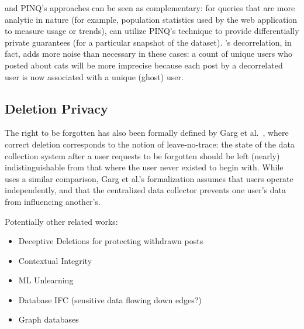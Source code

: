 \name and PINQ's approaches can be seen as complementary: for queries that are more analytic in nature (for example,
population statistics used by the web application to measure usage or trends), \name can utilize
PINQ's technique to provide differentially private guarantees (for a particular snapshot of the
dataset).  \name's decorrelation, in fact, adds more noise than necessary in these cases: a count
of unique users who posted about cats will be more imprecise because each post by a decorrelated
user is now associated with a unique (ghost) user.

\subsection{Deletion Privacy}
The right to be forgotten has also been formally defined by Garg et
al.~\cite{garg}, where correct deletion corresponds to the notion of
leave-no-trace: the state of the data collection system after a user requests to be forgotten should
be left (nearly) indistinguishable from that where the user never existed to begin with. While
\name uses a similar comparison, Garg et al.'s formalization assumes that users operate
independently, and that the centralized data collector prevents one user's data from influencing
another's.

Potentially other related works:
\begin{itemize}
    \item Deceptive Deletions for protecting withdrawn posts %
    \item Contextual Integrity
    \item ML Unlearning
    \item Database IFC (sensitive data flowing down edges?)
    \item Graph databases
\end{itemize}
\fi
